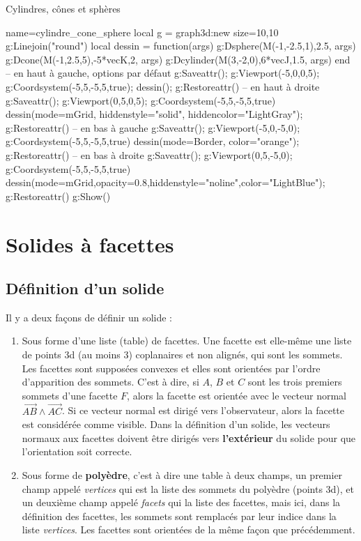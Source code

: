 \begin{demo}{Cylindres, cônes et sphères}
\begin{luadraw}{name=cylindre_cone_sphere}
local g = graph3d:new{ size={10,10} }
g:Linejoin("round")
local dessin = function(args)
    g:Dsphere(M(-1,-2.5,1),2.5, args)
    g:Dcone(M(-1,2.5,5),-5*vecK,2, args)
    g:Dcylinder(M(3,-2,0),6*vecJ,1.5, args)
end
-- en haut à gauche, options par défaut
g:Saveattr(); g:Viewport(-5,0,0,5); g:Coordsystem(-5,5,-5,5,true); dessin(); g:Restoreattr()
-- en haut à droite
g:Saveattr(); g:Viewport(0,5,0,5); g:Coordsystem(-5,5,-5,5,true)
dessin({mode=mGrid, hiddenstyle="solid", hiddencolor="LightGray"}); g:Restoreattr()
-- en bas à gauche
g:Saveattr(); g:Viewport(-5,0,-5,0); g:Coordsystem(-5,5,-5,5,true)
dessin({mode=Border, color="orange"}); g:Restoreattr()
-- en bas à droite
g:Saveattr(); g:Viewport(0,5,-5,0); g:Coordsystem(-5,5,-5,5,true)
dessin({mode=mGrid,opacity=0.8,hiddenstyle="noline",color="LightBlue"}); g:Restoreattr()
g:Show()            
\end{luadraw}
\end{demo}

\section{Solides à facettes}

\subsection{Définition d'un solide}

Il y a deux façons de définir un solide :
\begin{enumerate}
    \item Sous forme d'une liste (table) de facettes. Une facette est elle-même une liste de points 3d (au moins 3) coplanaires et non alignés, qui sont les sommets. Les facettes sont supposées convexes et elles sont orientées par l'ordre d'apparition des sommets. C'est à dire, si $A$, $B$ et $C$ sont les trois premiers sommets d'une facette $F$, alors la facette est orientée avec le vecteur normal $\vec{AB}\wedge\vec{AC}$. Si ce vecteur normal est dirigé vers l'observateur, alors la facette est considérée comme visible. Dans la définition d'un solide, les vecteurs normaux aux facettes doivent être dirigés vers \textbf{l'extérieur} du solide pour que l'orientation soit correcte.
    
    \item Sous forme de \textbf{polyèdre}, c'est à dire une table à deux champs, un premier champ appelé \emph{vertices} qui est la liste des sommets du polyèdre (points 3d), et un deuxième champ appelé \emph{facets} qui la liste des facettes, mais ici, dans la définition des facettes, les sommets sont remplacés par leur indice dans la liste \emph{vertices}. Les facettes sont orientées de la même façon que précédemment.
\end{enumerate}

